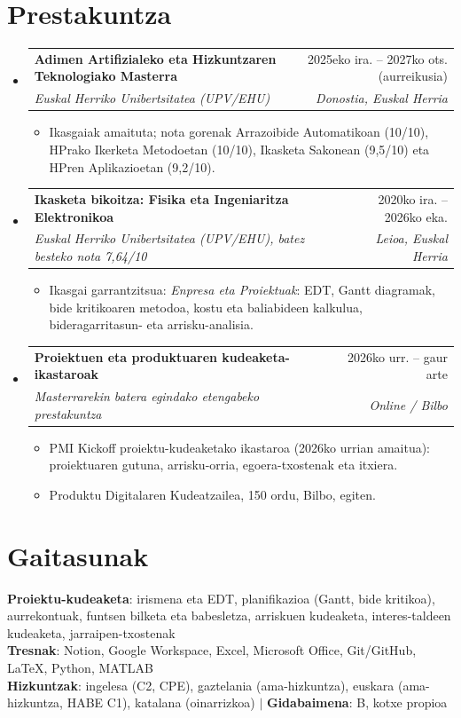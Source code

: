 \documentclass[a4paper,10pt]{article}
\makeatletter
\newcommand{\resumeItem}[1]{\item\small{{#1 \vspace{-2.5pt}}}}
\newcommand{\resumeSubheading}[4]{
  \vspace{3pt}\item
    \begin{tabular*}{\textwidth}[t]{l@{\extracolsep{\fill}}r}
      \textbf{#1} & \small #2 \\
      \textit{\small#3} & \textit{\small #4} \\
    \end{tabular*}\vspace{-6pt}
}
\newcommand{\resumeSubHeadingListStart}{\begin{itemize}[leftmargin=0.0in, label={}]}
\newcommand{\resumeSubHeadingListEnd}{\end{itemize}\vspace{-2pt}}
\newcommand{\resumeItemListStart}{\begin{itemize}[leftmargin=0.18in, topsep=2pt]}
\newcommand{\resumeItemListEnd}{\end{itemize}\vspace{-3pt}}
\makeatother
\begin{document}
\section{Prestakuntza}
  \resumeSubHeadingListStart
    \resumeSubheading
      {Adimen Artifizialeko eta Hizkuntzaren Teknologiako Masterra}{2025eko ira. -- 2027ko ots. (aurreikusia)}
      {Euskal Herriko Unibertsitatea (UPV/EHU)}{Donostia, Euskal Herria}
      \resumeItemListStart
        \resumeItem{Ikasgaiak amaituta; nota gorenak Arrazoibide Automatikoan (10/10), HPrako Ikerketa Metodoetan (10/10), Ikasketa Sakonean (9,5/10) eta HPren Aplikazioetan (9,2/10).}
      \resumeItemListEnd
    \resumeSubheading
      {Ikasketa bikoitza: Fisika eta Ingeniaritza Elektronikoa}{2020ko ira. -- 2026ko eka.}
      {Euskal Herriko Unibertsitatea (UPV/EHU), batez besteko nota 7,64/10}{Leioa, Euskal Herria}
      \resumeItemListStart
        \resumeItem{Ikasgai garrantzitsua: \textit{Enpresa eta Proiektuak}: EDT, Gantt diagramak, bide kritikoaren metodoa, kostu eta baliabideen kalkulua, bideragarritasun- eta arrisku-analisia.}
      \resumeItemListEnd
    \resumeSubheading
      {Proiektuen eta produktuaren kudeaketa-ikastaroak}{2026ko urr. -- gaur arte}
      {Masterrarekin batera egindako etengabeko prestakuntza}{Online / Bilbo}
      \resumeItemListStart
        \resumeItem{PMI Kickoff proiektu-kudeaketako ikastaroa (2026ko urrian amaitua): proiektuaren gutuna, arrisku-orria, egoera-txostenak eta itxiera.}
        \resumeItem{Produktu Digitalaren Kudeatzailea, 150 ordu, Bilbo, egiten.}
      \resumeItemListEnd
  \resumeSubHeadingListEnd

\section{Gaitasunak}
 \begin{itemize}[leftmargin=0in, label={}]
    \small{\item{
     \textbf{Proiektu-kudeaketa}{: irismena eta EDT, planifikazioa (Gantt, bide kritikoa), aurrekontuak, funtsen bilketa eta babesletza, arriskuen kudeaketa, interes-taldeen kudeaketa, jarraipen-txostenak} \\
     \textbf{Tresnak}{: Notion, Google Workspace, Excel, Microsoft Office, Git/GitHub, LaTeX, Python, MATLAB} \\
     \textbf{Hizkuntzak}{: ingelesa (C2, CPE), gaztelania (ama-hizkuntza), euskara (ama-hizkuntza, HABE C1), katalana (oinarrizkoa)} $|$ \textbf{Gidabaimena}{: B, kotxe propioa}
    }}
 \end{itemize}
\end{document}
